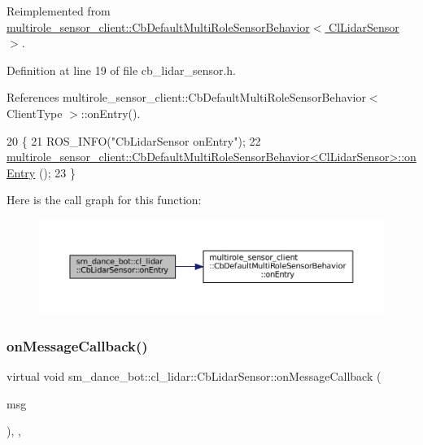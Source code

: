 Reimplemented from \hyperlink{classmultirole__sensor__client_1_1CbDefaultMultiRoleSensorBehavior_aa9241e84a1002547336a8754b7dd2d26}{multirole\+\_\+sensor\+\_\+client\+::\+Cb\+Default\+Multi\+Role\+Sensor\+Behavior$<$ Cl\+Lidar\+Sensor $>$}.



Definition at line 19 of file cb\+\_\+lidar\+\_\+sensor.\+h.



References multirole\+\_\+sensor\+\_\+client\+::\+Cb\+Default\+Multi\+Role\+Sensor\+Behavior$<$ Client\+Type $>$\+::on\+Entry().


\begin{DoxyCode}
20   \{
21     ROS\_INFO(\textcolor{stringliteral}{"CbLidarSensor onEntry"});
22     
      \hyperlink{classmultirole__sensor__client_1_1CbDefaultMultiRoleSensorBehavior_aa9241e84a1002547336a8754b7dd2d26}{multirole\_sensor\_client::CbDefaultMultiRoleSensorBehavior<ClLidarSensor>::onEntry}
      ();
23   \}
\end{DoxyCode}
Here is the call graph for this function\+:
\nopagebreak
\begin{figure}[H]
\begin{center}
\leavevmode
\includegraphics[width=350pt]{structsm__dance__bot_1_1cl__lidar_1_1CbLidarSensor_aad3468a6ae78999c9fd01bdb81b42a49_cgraph}
\end{center}
\end{figure}
\mbox{\label{structsm__dance__bot_1_1cl__lidar_1_1CbLidarSensor_a9f9cc01c88137995883845178eb0bed0}} 
\subsubsection{\texorpdfstring{on\+Message\+Callback()}{onMessageCallback()}}
{\footnotesize\ttfamily virtual void sm\+\_\+dance\+\_\+bot\+::cl\+\_\+lidar\+::\+Cb\+Lidar\+Sensor\+::on\+Message\+Callback (\begin{DoxyParamCaption}\item[{const sensor\+\_\+msgs\+::\+Laser\+Scan \&}]{msg }\end{DoxyParamCaption})\hspace{0.3cm}{\ttfamily [inline]}, {\ttfamily [override]}, {\ttfamily [virtual]}}




